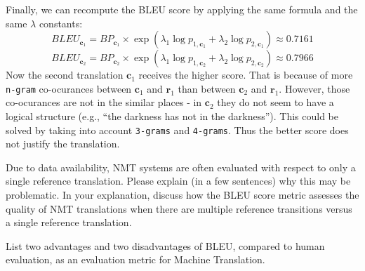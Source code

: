 \begin{parts}
\begin{subparts}
{        		Finally, we can recompute the BLEU score by applying the same formula and the same $\lambda$ constants:
        		\begin{equation}
        			BLEU_{\mathbf{c}_1}=BP_{\mathbf{c}_1}\times\exp\left(\lambda_1\log p_{1, \mathbf{c}_1}+\lambda_2\log p_{2, \mathbf{c}_1}\right)\approx 0.7161
        		\end{equation}
        		\begin{equation}
        			BLEU_{\mathbf{c}_2}=BP_{\mathbf{c}_2}\times\exp\left(\lambda_1\log p_{1, \mathbf{c}_2}+\lambda_2\log p_{2, \mathbf{c}_2}\right)\approx 0.7966
        		\end{equation}
        		Now the second translation $\mathbf{c}_1$ receives the higher score. That is because of more \texttt{n-gram} co-ocurances between $\mathbf{c}_1$ and $\mathbf{r}_1$ than between $\mathbf{c}_2$ and $\mathbf{r}_1$. However, those co-ocurances are not in the similar places - in $\mathbf{c}_2$ they do not seem to have a logical structure (e.g., ``the darkness has not in the darkness''). This could be solved by taking into account \texttt{3-grams} and \texttt{4-grams}. Thus the better score does not justify the translation.}
        
        \subpart[2] Due to data availability, NMT systems are often evaluated with respect to only a single reference translation. Please explain (in a few sentences) why this may be problematic. In your explanation, discuss how the BLEU score metric assesses the quality of NMT translations when there are multiple reference transitions versus a single reference translation.
        
        
        \subpart[2] List two advantages and two disadvantages of BLEU, compared to human evaluation, as an evaluation metric for Machine Translation. 
        

\end{subparts}
\end{parts}
